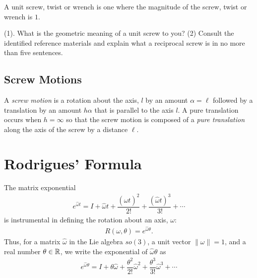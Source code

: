 \noindent 
\begin{homework}
	A unit screw, twist or wrench is one where the magnitude of the screw, twist or wrench is $1$.  
	
	(1). What is the geometric meaning of a unit screw to you? %
	(2) Consult the identified reference materials and explain what a reciprocal screw is in no more than five sentences.
\end{homework}


\subsection{Screw Motions}

A \textit{screw motion} is a rotation about the axis, $l$ by an amount $\alpha = \ell$ followed by a translation by an amount $h\alpha$ that is parallel to the axis $l$. A pure translation occurs when $h=\infty$ so that the screw motion is composed of a \textit{pure translation} along the axis of the screw by a distance $\ell$. 



\section{Rodrigues' Formula}
%
The matrix exponential
%
\begin{align}
	e^{\hat{\omega}t} = I + \hat{\omega}t + \dfrac{(\hat{\omega}t)^2}{2!} + \dfrac{(\hat{\omega}t)^3}{3!} + \cdots
\end{align}
%
is instrumental in defining the rotation about an axis, $\omega$: 
%
\begin{align}
	R(\omega, \theta) = e^{\hat{\omega} \theta}.
\end{align}
%
Thus, for a matrix $\hat{\omega}$ in the Lie algebra ${so}(3)$, a unit vector $\|\omega\| = 1$, and a real number $\theta \in \mathbb{R}$, we write the exponential of $\hat{\omega} \theta$ as
%
\begin{align}
e^{\hat{\omega}\theta} = I + \theta \hat{\omega} + \dfrac{\theta^2}{2!}\hat{\omega}^2 + \dfrac{\theta^3}{3!}\hat{\omega}^3 + \cdots
\end{align}

